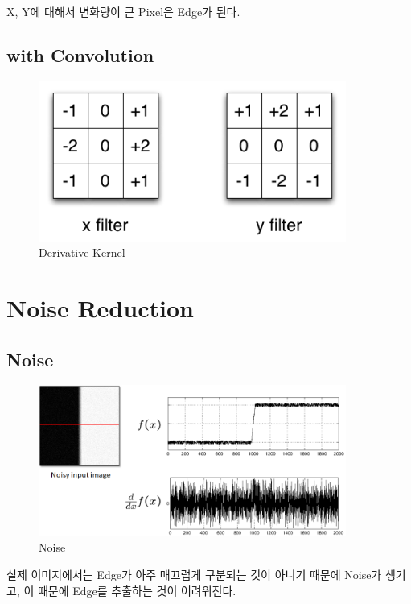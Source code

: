 \documentclass[]{report}
\begin{document}
X, Y에 대해서 변화량이 큰 Pixel은 Edge가 된다. \\


\subsection{with Convolution}
\begin{figure}[ht!]
	\centering
	\includegraphics[width=0.9\textwidth]{image/1-2.png}
	\caption{Derivative Kernel}
	\label{1-2}
\end{figure}


\section{Noise Reduction}
\subsection{Noise}

\begin{figure}[ht!]
	\centering
	\includegraphics[width=0.9\textwidth]{image/1-3.png}
	\caption{Noise}
	\label{1-3}
\end{figure}

실제 이미지에서는 Edge가 아주 매끄럽게 구분되는 것이 아니기 때문에 Noise가 생기고, 이 때문에 Edge를 추출하는 것이 어려워진다. \\
\end{document}
